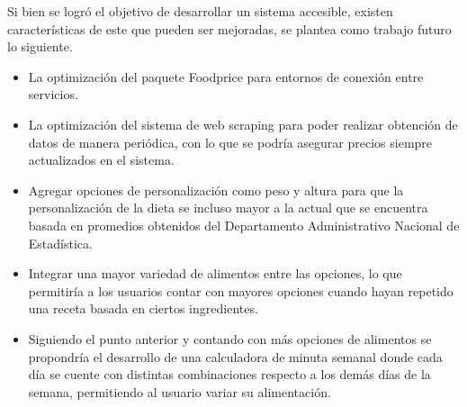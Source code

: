 \noindent Si bien se logr\'o el objetivo de desarrollar un sistema accesible, existen caracter\'isticas de este que pueden ser mejoradas, se plantea como trabajo futuro lo siguiente.

\begin{itemize}
\item  La optimizaci\'on del paquete Foodprice para entornos de conexi\'on entre servicios.

\item  La optimizaci\'on del sistema de web scraping para poder realizar obtenci\'on de datos de manera peri\'odica, con lo que se podr\'ia asegurar precios siempre actualizados en el sistema.

\item  Agregar opciones de personalizaci\'on como peso y altura para que la personalizaci\'on de la dieta se incluso mayor a la actual que se encuentra basada en promedios obtenidos del Departamento Administrativo Nacional de Estad\'istica.

\item  Integrar una mayor variedad de alimentos entre las opciones, lo que permitir\'ia a los usuarios contar con mayores opciones cuando hayan repetido una receta basada en ciertos ingredientes.

\item  Siguiendo el punto anterior y contando con m\'as opciones de alimentos se propondr\'ia el desarrollo de una calculadora de minuta semanal donde cada d\'ia se cuente con distintas combinaciones respecto a los dem\'as d\'ias de la semana, permitiendo al usuario variar su alimentaci\'on.

\end{itemize}